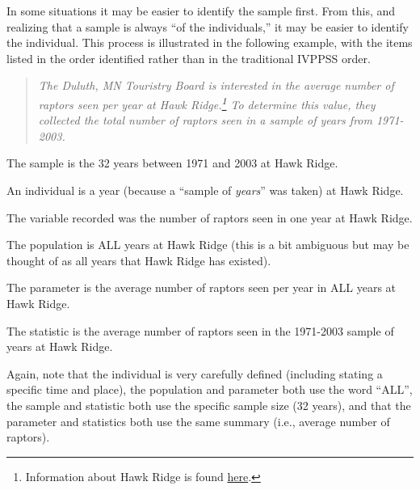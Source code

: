 \documentclass[10pt,openany]{book}\usepackage[]{graphicx}\usepackage[]{color}
\begin{document}
In some situations it may be easier to identify the sample first. From this, and realizing that a sample is always ``of the individuals,'' it may be easier to identify the individual. This process is illustrated in the following example, with the items listed in the order identified rather than in the traditional IVPPSS order.

\vspace{-6pt}
\begin{quote}
\textit{The Duluth, MN Touristry Board is interested in the average number of raptors seen per year at Hawk Ridge.\footnote{Information about Hawk Ridge is found \href{http://www.hawkridge.org/}{here}.}  To determine this value, they collected the total number of raptors seen in a sample of years from 1971-2003.}
\end{quote}
\vspace{-6pt}

\begin{Itemize}
  \item The sample is the 32 years between 1971 and 2003 at Hawk Ridge.
  \item An individual is a year (because a ``sample of \emph{years}'' was taken) at Hawk Ridge.
  \item The variable recorded was the number of raptors seen in one year at Hawk Ridge.
  \item The population is ALL years at Hawk Ridge (this is a bit ambiguous but may be thought of as all years that Hawk Ridge has existed).
  \item The parameter is the average number of raptors seen per year in ALL years at Hawk Ridge.
  \item The statistic is the average number of raptors seen in the 1971-2003 sample of years at Hawk Ridge.
\end{Itemize}

Again, note that the individual is very carefully defined (including stating a specific time and place), the population and parameter both use the word ``ALL'', the sample and statistic both use the specific sample size (32 years), and that the parameter and statistics both use the same summary (i.e., average number of raptors).


\vspace{-12pt}

\vspace{-12pt}
\end{document}
